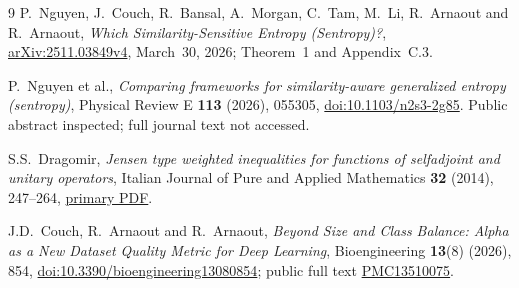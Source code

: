 \documentclass[11pt]{article}
\begin{document}
\begin{thebibliography}{9}
P.~Nguyen, J.~Couch, R.~Bansal, A.~Morgan, C.~Tam, M.~Li,
R.~Arnaout and R.~Arnaout,
\emph{Which Similarity-Sensitive Entropy (Sentropy)?},
\href{https://arxiv.org/html/2511.03849v4}{arXiv:2511.03849v4},
March~30, 2026; Theorem~1 and Appendix~C.3.

P.~Nguyen et al.,
\emph{Comparing frameworks for similarity-aware generalized entropy
(sentropy)}, Physical Review E \textbf{113} (2026), 055305,
\href{https://doi.org/10.1103/n2s3-2g85}{doi:10.1103/n2s3-2g85}.
Public abstract inspected; full journal text not accessed.

S.S.~Dragomir,
\emph{Jensen type weighted inequalities for functions of selfadjoint
and unitary operators}, Italian Journal of Pure and Applied Mathematics
\textbf{32} (2014), 247--264,
\href{https://ijpam.uniud.it/online_issue/201432/23-Dragomir.pdf}{primary PDF}.

J.D.~Couch, R.~Arnaout and R.~Arnaout,
\emph{Beyond Size and Class Balance: Alpha as a New Dataset Quality
Metric for Deep Learning}, Bioengineering \textbf{13}(8) (2026), 854,
\href{https://doi.org/10.3390/bioengineering13080854}{doi:10.3390/bioengineering13080854};
public full text \href{https://pmc.ncbi.nlm.nih.gov/articles/PMC13510075/}{PMC13510075}.
\end{thebibliography}
\end{document}
